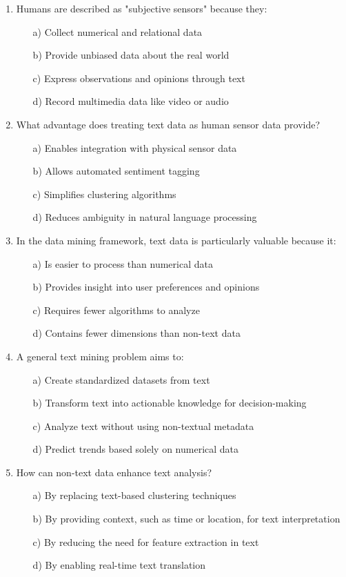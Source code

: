 \documentclass[8pt]{extarticle}
\begin{document}
\begin{multicols}{2}
\begin{enumerate}
\item Humans are described as "subjective sensors" because they:
\begin{itemize}
\item[a)] Collect numerical and relational data
\item[b)] Provide unbiased data about the real world
\item[c)] Express observations and opinions through text
\item[d)] Record multimedia data like video or audio
\end{itemize}

\item What advantage does treating text data as human sensor data provide?
\begin{itemize}
\item[a)] Enables integration with physical sensor data
\item[b)] Allows automated sentiment tagging
\item[c)] Simplifies clustering algorithms
\item[d)] Reduces ambiguity in natural language processing
\end{itemize}

\item In the data mining framework, text data is particularly valuable because it:
\begin{itemize}
\item[a)] Is easier to process than numerical data
\item[b)] Provides insight into user preferences and opinions
\item[c)] Requires fewer algorithms to analyze
\item[d)] Contains fewer dimensions than non-text data
\end{itemize}

\item A general text mining problem aims to:
\begin{itemize}
\item[a)] Create standardized datasets from text
\item[b)] Transform text into actionable knowledge for decision-making
\item[c)] Analyze text without using non-textual metadata
\item[d)] Predict trends based solely on numerical data
\end{itemize}

\item How can non-text data enhance text analysis?
\begin{itemize}
\item[a)] By replacing text-based clustering techniques
\item[b)] By providing context, such as time or location, for text interpretation
\item[c)] By reducing the need for feature extraction in text
\item[d)] By enabling real-time text translation
\end{itemize}


\end{enumerate}
\end{multicols}
\end{document}
